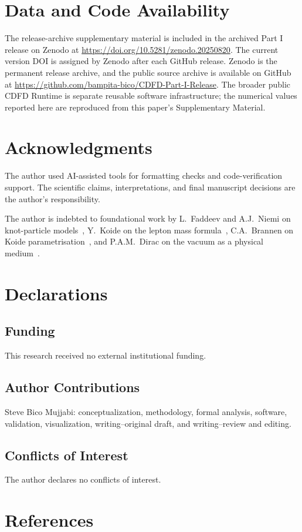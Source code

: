 \documentclass[11pt]{article}
\begin{document}
\section*{Data and Code Availability}

The release-archive supplementary material is included in the archived Part I
release on Zenodo at \url{https://doi.org/10.5281/zenodo.20250820}. The current version DOI is assigned by Zenodo after each GitHub release. Zenodo is the
permanent release archive, and the public source archive is available on GitHub at
\url{https://github.com/bampita-bico/CDFD-Part-I-Release}. The broader public CDFD
Runtime is separate reusable software infrastructure; the numerical values reported
here are reproduced from this paper's Supplementary Material.


\section*{Acknowledgments}
The author used AI-assisted tools for formatting checks and code-verification
support. The scientific claims, interpretations, and final manuscript decisions
are the author's responsibility.

The author is indebted to foundational work by
L.~Faddeev and A.J.~Niemi on knot-particle models~\cite{FaddeevNiemi1997},
Y.~Koide on the lepton mass formula~\cite{Koide1983},
C.A.~Brannen on Koide parametrisation~\cite{Brannen2006}, and
P.A.M.~Dirac on the vacuum as a physical medium~\cite{Dirac1951}.

\section*{Declarations}

\subsection*{Funding}
This research received no external institutional funding.

\subsection*{Author Contributions}
Steve Bico Mujjabi: conceptualization, methodology, formal analysis, software,
validation, visualization, writing--original draft, and writing--review and
editing.

\subsection*{Conflicts of Interest}
The author declares no conflicts of interest.

\section*{References}


\end{document}
